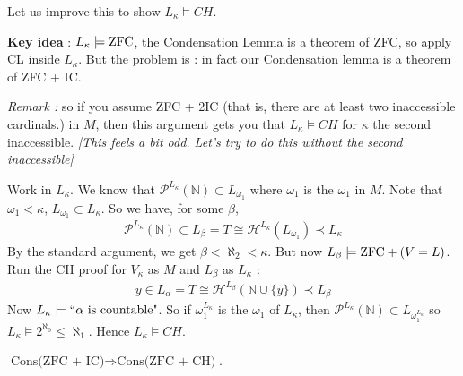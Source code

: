 \documentclass[12pt,a4paper]{article}
\begin{document}
Let us improve this to show $L_{\kappa} \models CH$.

\textbf{Key idea} : $L_{\kappa} \models \text{ZFC}$, the Condensation Lemma is a theorem of ZFC, so apply CL inside $L_{\kappa}$. But the problem is : in fact our Condensation lemma is a theorem of ZFC + IC.
\s

\emph{Remark :} so if you assume ZFC + 2IC (that is, there are at least two inaccessible cardinals.) in $M$, then this argument gets you that $L_{\kappa} \models CH$ for $\kappa$ the second inaccessible. \emph{[This feels a bit odd. Let's try to do this without the second inaccessible]}
\s

Work in $L_{\kappa}$. We know that $\mathscr{P}^{L_{\kappa}}(\mathbb{N}) \subset L_{\omega_1}$ where $\omega_1$ is the $\omega_1$ in $M$. Note that $\omega_1 < \kappa$, $L_{\omega_1}\subset L_{\kappa}$. So we have, for some $\beta$,
\begin{align*}
\mathscr{P}^{L_{\kappa}}(\mathbb{N}) \subset L_{\beta} =T \cong \mathcal{H}^{L_{\kappa}}(L_{\omega_1}) \prec L_{\kappa}
\end{align*}
By the standard argument, we get $\beta < \aleph_2 < \kappa$. But now $L_{\beta} \models \text{ZFC} + (V=L)$. Run the CH proof for $V_{\kappa}$ as $M$ and $L_{\beta}$ as $L_{\kappa}$ :
\begin{align*}
y \in L_{\alpha} = T \cong \mathcal{H}^{L_{\beta}}(\mathbb{N}\cup \{y\}) \prec L_{\beta}
\end{align*}
Now $L_{\kappa} \models ``\alpha \text{ is countable"}$. So if $\omega_1^{L_{\kappa}}$ is the $\omega_1$ of $L_{\kappa}$, then $\mathscr{P}^{L_{\kappa}}(\mathbb{N}) \subset L_{\omega_1^{L_{\kappa}}}$ so $L_{\kappa} \models 2^{\aleph_0} \leq \aleph_1$. Hence $L_{\kappa} \models CH$.
\s

\thm $\text{Cons(ZFC + IC)} \Rightarrow \text{Cons(ZFC + CH)}$.
\s
\end{document}
